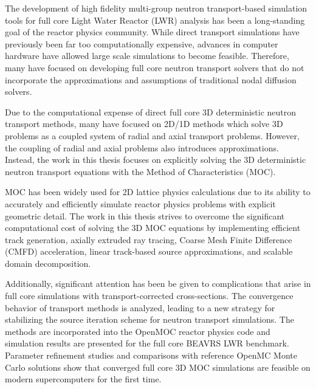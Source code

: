 \begin{abstractpage}

The development of high fidelity multi-group neutron transport-based simulation tools for full core Light Water Reactor (LWR) analysis has been a long-standing goal of the reactor physics community. While direct transport simulations have previously been far too computationally expensive, advances in computer hardware have allowed large scale simulations to become feasible. Therefore, many have focused on developing full core neutron transport solvers that do not incorporate the approximations and assumptions of traditional nodal diffusion solvers. 

Due to the computational expense of direct full core 3D deterministic neutron transport methods, many have focused on 2D/1D methods which solve 3D problems as a coupled system of radial and axial transport problems. However, the coupling of radial and axial problems also introduces approximations. Instead, the work in this thesis focuses on explicitly solving the 3D deterministic neutron transport equations with the Method of Characteristics (MOC).

MOC has been widely used for 2D lattice physics calculations due to its ability to accurately and efficiently simulate reactor physics problems with explicit geometric detail. The work in this thesis strives to overcome the significant computational cost of solving the 3D MOC equations by implementing efficient track generation, axially extruded ray tracing, Coarse Mesh Finite Difference (CMFD) acceleration, linear track-based source approximations, and scalable domain decomposition. 

Additionally, significant attention has been be given to complications that arise in full core simulations with transport-corrected cross-sections. The convergence behavior of transport methods is analyzed, leading to a new strategy for stabilizing the source iteration scheme for neutron transport simulations. The methods are incorporated into the OpenMOC reactor physics code and simulation results are presented for the full core BEAVRS LWR benchmark. Parameter refinement studies and comparisons with reference OpenMC Monte Carlo solutions show that converged full core 3D MOC simulations are feasible on modern supercomputers for the first time.



\end{abstractpage}
